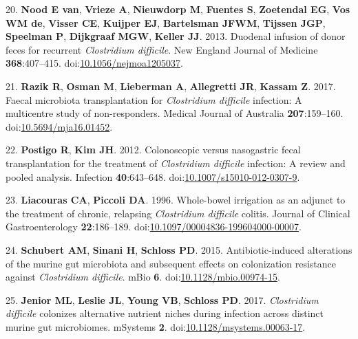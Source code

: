 \documentclass[
  11pt,
]{article}
\begin{document}
\leavevmode\hypertarget{ref-vanNood2013}{}%
20. \textbf{Nood E van}, \textbf{Vrieze A}, \textbf{Nieuwdorp M},
\textbf{Fuentes S}, \textbf{Zoetendal EG}, \textbf{Vos WM de},
\textbf{Visser CE}, \textbf{Kuijper EJ}, \textbf{Bartelsman JFWM},
\textbf{Tijssen JGP}, \textbf{Speelman P}, \textbf{Dijkgraaf MGW},
\textbf{Keller JJ}. 2013. Duodenal infusion of donor feces for recurrent
\emph{Clostridium difficile}. New England Journal of Medicine
\textbf{368}:407--415.
doi:\href{https://doi.org/10.1056/nejmoa1205037}{10.1056/nejmoa1205037}.

\leavevmode\hypertarget{ref-Razik2017}{}%
21. \textbf{Razik R}, \textbf{Osman M}, \textbf{Lieberman A},
\textbf{Allegretti JR}, \textbf{Kassam Z}. 2017. Faecal microbiota
transplantation for \emph{Clostridium difficile} infection: A
multicentre study of non-responders. Medical Journal of Australia
\textbf{207}:159--160.
doi:\href{https://doi.org/10.5694/mja16.01452}{10.5694/mja16.01452}.

\leavevmode\hypertarget{ref-Postigo2012}{}%
22. \textbf{Postigo R}, \textbf{Kim JH}. 2012. Colonoscopic versus
nasogastric fecal transplantation for the treatment of \emph{Clostridium
difficile} infection: A review and pooled analysis. Infection
\textbf{40}:643--648.
doi:\href{https://doi.org/10.1007/s15010-012-0307-9}{10.1007/s15010-012-0307-9}.

\leavevmode\hypertarget{ref-Liacouras1996}{}%
23. \textbf{Liacouras CA}, \textbf{Piccoli DA}. 1996. Whole-bowel
irrigation as an adjunct to the treatment of chronic, relapsing
\emph{Clostridium difficile} colitis. Journal of Clinical
Gastroenterology \textbf{22}:186--189.
doi:\href{https://doi.org/10.1097/00004836-199604000-00007}{10.1097/00004836-199604000-00007}.

\leavevmode\hypertarget{ref-Schubert2015}{}%
24. \textbf{Schubert AM}, \textbf{Sinani H}, \textbf{Schloss PD}. 2015.
Antibiotic-induced alterations of the murine gut microbiota and
subsequent effects on colonization resistance against \emph{Clostridium
difficile}. mBio \textbf{6}.
doi:\href{https://doi.org/10.1128/mbio.00974-15}{10.1128/mbio.00974-15}.

\leavevmode\hypertarget{ref-Jenior2017}{}%
25. \textbf{Jenior ML}, \textbf{Leslie JL}, \textbf{Young VB},
\textbf{Schloss PD}. 2017. \emph{Clostridium difficile} colonizes
alternative nutrient niches during infection across distinct murine gut
microbiomes. mSystems \textbf{2}.
doi:\href{https://doi.org/10.1128/msystems.00063-17}{10.1128/msystems.00063-17}.
\end{document}
